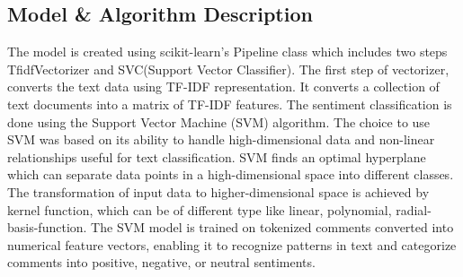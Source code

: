 \documentclass[11pt,article,oneside]{article}
\begin{document}
\subsection{Model \& Algorithm Description}
The model is created using scikit-learn's Pipeline class which includes two steps TfidfVectorizer and SVC(Support Vector Classifier). The first step of vectorizer, converts the text data using TF-IDF representation. It converts a collection of text documents into a matrix of TF-IDF features. The sentiment classification is done using the Support Vector Machine (SVM) algorithm\citep{SVMarticle}. The choice to use SVM was based on its ability to handle high-dimensional data and non-linear relationships useful for text classification. SVM finds an optimal hyperplane which can separate data points in a high-dimensional space into different classes. The transformation of input data to higher-dimensional space is achieved by kernel function, which can be of different type like linear, polynomial, radial-basis-function. The SVM model is trained on tokenized comments converted into numerical feature vectors, enabling it to recognize patterns in text and categorize comments into positive, negative, or neutral sentiments.
\end{document}
